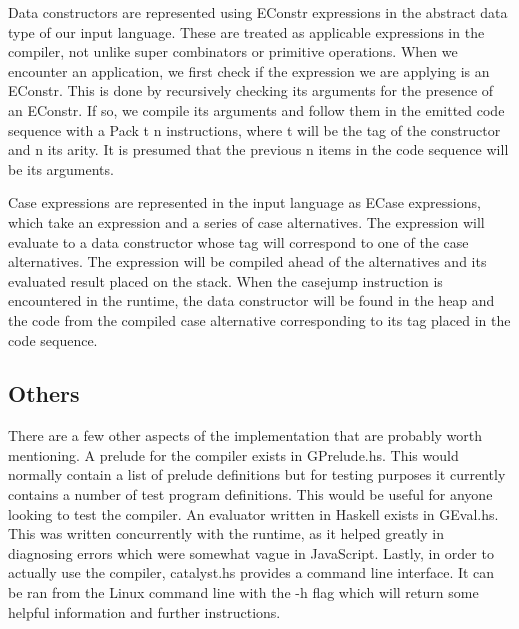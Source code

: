Data constructors are represented using EConstr expressions in 
the abstract data type of our input language. These are treated
as applicable expressions in the compiler, not unlike super 
combinators or primitive operations. When we encounter an 
application, we first check if the expression we are applying
is an EConstr. This is done by recursively checking its arguments
for the presence of an EConstr. If so, we compile its arguments 
and follow them in the emitted code sequence with a Pack t n 
instructions, where t will be the tag of the constructor and n 
its arity. It is presumed that the previous n items in the code 
sequence will be its arguments. 

Case expressions are represented in the input language as ECase
expressions, which take an expression and a series of case 
alternatives. The expression will evaluate to a data constructor
whose tag will correspond to one of the case alternatives. The 
expression will be compiled ahead of the alternatives and its
evaluated result placed on the stack. When the casejump instruction 
is encountered in the runtime, the data constructor will be 
found in the heap and the code from the compiled case alternative
corresponding to its tag placed in the code sequence.

\pagebreak

\subsection{Others}
There are a few other aspects of the implementation that
are probably worth mentioning. A prelude for the compiler exists
in GPrelude.hs. This would normally contain a list of prelude
definitions but for testing purposes it currently contains a 
number of test program definitions. This would be useful for
anyone looking to test the compiler.  An evaluator written in 
Haskell exists in GEval.hs. This was written concurrently with 
the runtime, as it helped greatly in diagnosing errors which 
were somewhat vague in JavaScript. Lastly, in order to actually
use the compiler, catalyst.hs provides a command line interface.
It can be ran from the Linux command line with the -h flag which
will return some helpful information and further instructions.






















